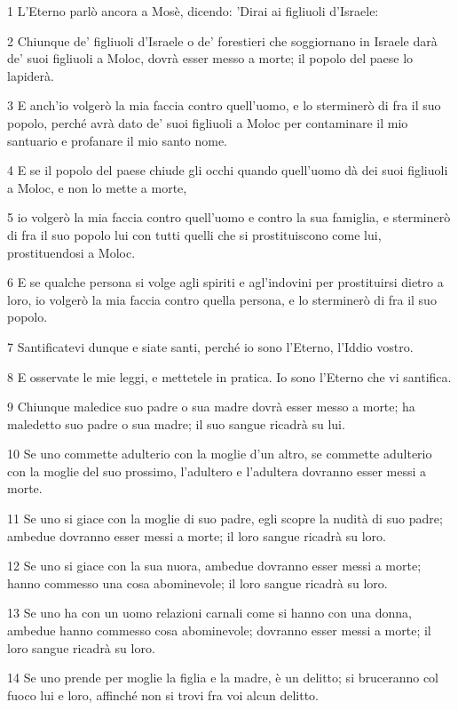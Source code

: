 \par 1 L'Eterno parlò ancora a Mosè, dicendo: 'Dirai ai figliuoli d'Israele:
\par 2 Chiunque de' figliuoli d'Israele o de' forestieri che soggiornano in Israele darà de' suoi figliuoli a Moloc, dovrà esser messo a morte; il popolo del paese lo lapiderà.
\par 3 E anch'io volgerò la mia faccia contro quell'uomo, e lo sterminerò di fra il suo popolo, perché avrà dato de' suoi figliuoli a Moloc per contaminare il mio santuario e profanare il mio santo nome.
\par 4 E se il popolo del paese chiude gli occhi quando quell'uomo dà dei suoi figliuoli a Moloc, e non lo mette a morte,
\par 5 io volgerò la mia faccia contro quell'uomo e contro la sua famiglia, e sterminerò di fra il suo popolo lui con tutti quelli che si prostituiscono come lui, prostituendosi a Moloc.
\par 6 E se qualche persona si volge agli spiriti e agl'indovini per prostituirsi dietro a loro, io volgerò la mia faccia contro quella persona, e lo sterminerò di fra il suo popolo.
\par 7 Santificatevi dunque e siate santi, perché io sono l'Eterno, l'Iddio vostro.
\par 8 E osservate le mie leggi, e mettetele in pratica. Io sono l'Eterno che vi santifica.
\par 9 Chiunque maledice suo padre o sua madre dovrà esser messo a morte; ha maledetto suo padre o sua madre; il suo sangue ricadrà su lui.
\par 10 Se uno commette adulterio con la moglie d'un altro, se commette adulterio con la moglie del suo prossimo, l'adultero e l'adultera dovranno esser messi a morte.
\par 11 Se uno si giace con la moglie di suo padre, egli scopre la nudità di suo padre; ambedue dovranno esser messi a morte; il loro sangue ricadrà su loro.
\par 12 Se uno si giace con la sua nuora, ambedue dovranno esser messi a morte; hanno commesso una cosa abominevole; il loro sangue ricadrà su loro.
\par 13 Se uno ha con un uomo relazioni carnali come si hanno con una donna, ambedue hanno commesso cosa abominevole; dovranno esser messi a morte; il loro sangue ricadrà su loro.
\par 14 Se uno prende per moglie la figlia e la madre, è un delitto; si bruceranno col fuoco lui e loro, affinché non si trovi fra voi alcun delitto.
